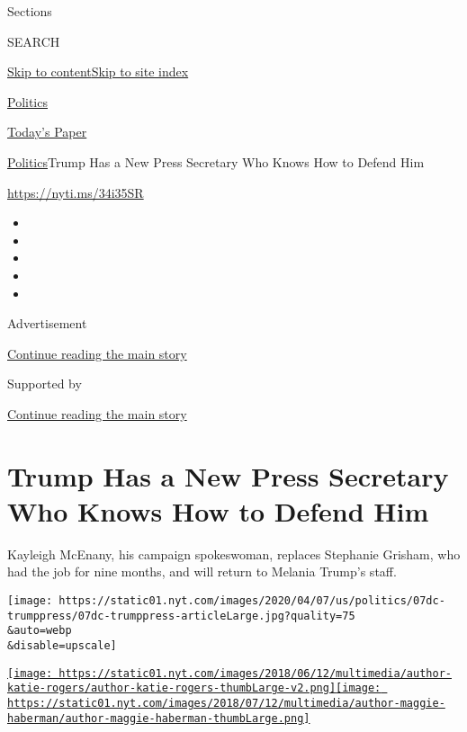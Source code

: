 Sections

SEARCH

\protect\hyperlink{site-content}{Skip to
content}\protect\hyperlink{site-index}{Skip to site index}

\href{https://www.nytimes.com/section/politics}{Politics}

\href{https://myaccount.nytimes.com/auth/login?response_type=cookie\&client_id=vi}{}

\href{https://www.nytimes.com/section/todayspaper}{Today's Paper}

\href{/section/politics}{Politics}\textbar{}Trump Has a New Press
Secretary Who Knows How to Defend Him

\url{https://nyti.ms/34i35SR}

\begin{itemize}
\item
\item
\item
\item
\item
\end{itemize}

Advertisement

\protect\hyperlink{after-top}{Continue reading the main story}

Supported by

\protect\hyperlink{after-sponsor}{Continue reading the main story}

\hypertarget{trump-has-a-new-press-secretary-who-knows-how-to-defend-him}{%
\section{Trump Has a New Press Secretary Who Knows How to Defend
Him}\label{trump-has-a-new-press-secretary-who-knows-how-to-defend-him}}

Kayleigh McEnany, his campaign spokeswoman, replaces Stephanie Grisham,
who had the job for nine months, and will return to Melania Trump's
staff.

\texttt{[image: https://static01.nyt.com/images/2020/04/07/us/politics/07dc-trumppress/07dc-trumppress-articleLarge.jpg?quality=75\\\&auto=webp\\\&disable=upscale]}

\href{https://www.nytimes.com/by/katie-rogers}{\texttt{[image: https://static01.nyt.com/images/2018/06/12/multimedia/author-katie-rogers/author-katie-rogers-thumbLarge-v2.png]}}\href{https://www.nytimes.com/by/maggie-haberman}{\texttt{[image: https://static01.nyt.com/images/2018/07/12/multimedia/author-maggie-haberman/author-maggie-haberman-thumbLarge.png]}}

